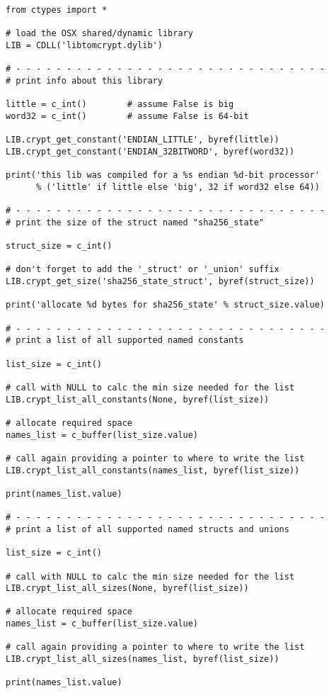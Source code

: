 \documentclass[synpaper]{book}
\begin{document}
\begin{verbatim}
from ctypes import *

# load the OSX shared/dynamic library
LIB = CDLL('libtomcrypt.dylib')

# - - - - - - - - - - - - - - - - - - - - - - - - - - - - - - -
# print info about this library

little = c_int()        # assume False is big
word32 = c_int()        # assume False is 64-bit

LIB.crypt_get_constant('ENDIAN_LITTLE', byref(little))
LIB.crypt_get_constant('ENDIAN_32BITWORD', byref(word32))

print('this lib was compiled for a %s endian %d-bit processor'
      % ('little' if little else 'big', 32 if word32 else 64))

# - - - - - - - - - - - - - - - - - - - - - - - - - - - - - - -
# print the size of the struct named "sha256_state"

struct_size = c_int()

# don't forget to add the '_struct' or '_union' suffix
LIB.crypt_get_size('sha256_state_struct', byref(struct_size))

print('allocate %d bytes for sha256_state' % struct_size.value)

# - - - - - - - - - - - - - - - - - - - - - - - - - - - - - - -
# print a list of all supported named constants

list_size = c_int()

# call with NULL to calc the min size needed for the list
LIB.crypt_list_all_constants(None, byref(list_size))

# allocate required space
names_list = c_buffer(list_size.value)

# call again providing a pointer to where to write the list
LIB.crypt_list_all_constants(names_list, byref(list_size))

print(names_list.value)

# - - - - - - - - - - - - - - - - - - - - - - - - - - - - - - -
# print a list of all supported named structs and unions

list_size = c_int()

# call with NULL to calc the min size needed for the list
LIB.crypt_list_all_sizes(None, byref(list_size))

# allocate required space
names_list = c_buffer(list_size.value)

# call again providing a pointer to where to write the list
LIB.crypt_list_all_sizes(names_list, byref(list_size))

print(names_list.value)
\end{verbatim}
\end{document}
